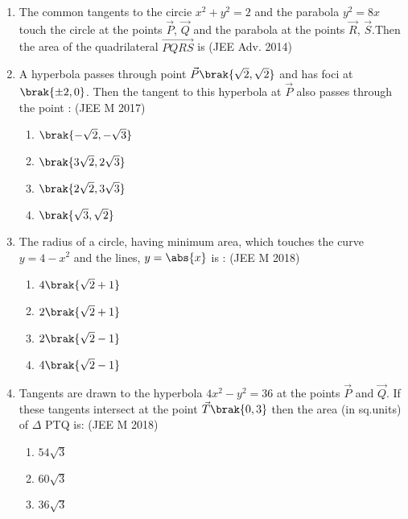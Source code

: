 \begin{enumerate}
	\item The common tangents to the circie $x^2+y^2=2$ and the parabola $y^2=8x$ touch the circle at the points $\vec{P}$, $\vec{Q}$ and the parabola at the points $\vec{R}$, $\vec{S}$.Then the area of the quadrilateral $\vec{PQRS}$ is \hfill(JEE Adv. 2014)\\
		\begin{enumerate}
		\end{enumerate}
\item A hyperbola passes through point $\vec{P}\brak{\sqrt2,\sqrt2}$  and  has  foci  at $\brak{\pm2,0}$. Then  the  tangent  to  this  hyperbola at $\vec{P}$ also passes through the point :
      \hfill{(JEE M 2017)} 
	\begin{enumerate}
    		\item  $\brak{-\sqrt2,-\sqrt3}$
    		\item  $\brak{3\sqrt2,2\sqrt3}$
    		\item  $\brak{2\sqrt2,3\sqrt3}$
    		\item  $\brak{\sqrt3,\sqrt2}$
	\end{enumerate}
\item  The radius of a circle, having minimum area, which touches the curve $y=4-x^2$ and the lines, $y=\abs{x}$ is : 
   \hfill{(JEE M 2018)}
	\begin{enumerate}
     		\item $4\brak{\sqrt2+1}$
     		\item $2\brak{\sqrt2+1}$
     		\item $2\brak{\sqrt2-1}$
     		\item $4\brak{\sqrt2-1}$
	\end{enumerate}
\item Tangents are drawn to the hyperbola $4x^2-y^2=36$ at the points $\vec{P}$ and $\vec{Q}$. If  these tangents intersect  at the point $\vec{T}\brak{0,3}$ then the area (in sq.units) of $\Delta$ PTQ is:
     \hfill{(JEE M 2018)}
	\begin{enumerate}
     		\item $54\sqrt3$
     		\item $60\sqrt3$
     		\item $36\sqrt3$ 

\end{enumerate}
\end{enumerate}

